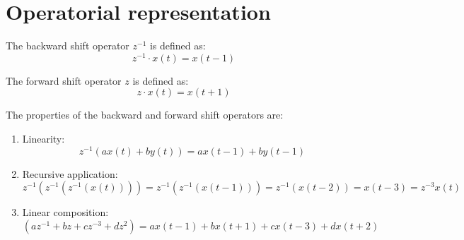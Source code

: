 \section{Operatorial representation}

\begin{definition}
    The backward shift operator $z^{-1}$ is defined as: 
    \[z^{-1}\cdot x(t)=x(t-1)\]
\end{definition}
\begin{definition}
    The forward shift operator $z$ is defined as: 
    \[z\cdot x(t)=x(t+1)\]
\end{definition}
The properties of the backward and forward shift operators are:
\begin{enumerate}
    \item Linearity:
        \[z^{-1}\left(ax(t)+by(t) \right)=ax(t-1)+by(t-1)\]
    \item Recursive application: 
        \[z^{-1}\left(z^{-1}\left(z^{-1}\left(x(t)\right)\right)\right)=z^{-1}\left(z^{-1}\left(x(t-1)\right)\right)=z^{-1}\left(x(t-2)\right)=x(t-3)=z^{-3}x(t)\]
    \item Linear composition: 
        \[\left(az^{-1}+bz+cz^{-3}+dz^2\right)=ax(t-1)+bx(t+1)+cx(t-3)+dx(t+2)\]
\end{enumerate} 